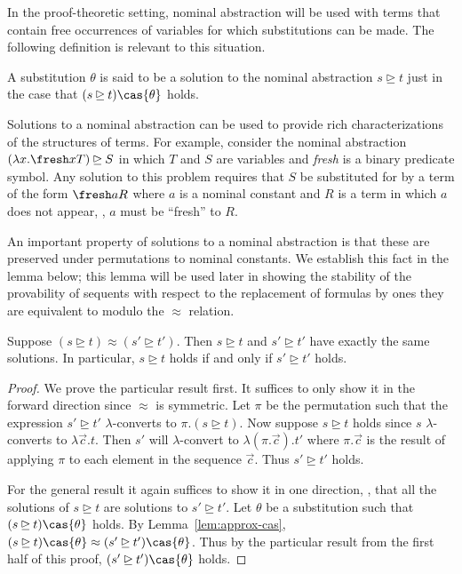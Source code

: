 In the proof-theoretic setting, nominal abstraction will be used with
terms that contain free occurrences of variables for which
substitutions can be made. The following definition is relevant to
this situation.

\begin{definition}\label{nasolution}
A substitution $\theta$ is said to be a solution to the nominal
abstraction $s \unrhd t$ just in the case that $(s\unrhd t)\cas{\theta}$ holds.
\end{definition}

Solutions to a nominal abstraction can be used to provide rich
characterizations of the structures of terms. For example, consider
the nominal abstraction
$(\lambda x.\fresh x T) \unrhd S$ in which $T$ and $S$ are
variables and {\sl fresh} is a binary predicate symbol.  Any solution
to this problem requires that $S$ be
substituted for by a term of the form $\fresh a R$ where $a$
is a nominal constant and $R$ is a term in which $a$ does not appear,
\ie, $a$ must be ``fresh'' to $R$.

An important property of solutions to a nominal abstraction is that
these are preserved under permutations to nominal constants. We
establish this fact in the lemma below; this lemma will be used later
in showing the stability of the provability of sequents with
respect to the replacement of formulas by ones they are equivalent to
modulo the $\approx$ relation.

\begin{lemma}
\label{lem:na-approx}
Suppose $(s\unrhd t) \approx (s'\unrhd t')$. Then $s\unrhd t$ and
$s'\unrhd t'$ have exactly the same solutions. In particular,
$s\unrhd t$ holds if and only if $s'\unrhd t'$ holds.
\end{lemma}
\begin{proof}
We prove the particular result first. It suffices to only show it in
the forward direction since $\approx$ is symmetric. Let $\pi$ be the
permutation such that the expression $s'\unrhd t'$ $\lambda$-converts to
$\pi.(s\unrhd t)$. Now suppose $s \unrhd t$ holds since $s$
$\lambda$-converts to $\lambda\vec{c}.t$. Then $s'$ will
$\lambda$-convert to $\lambda(\pi.\vec{c}).t'$ where $\pi.\vec{c}$ is
the result of applying $\pi$ to each element in the sequence $\vec{c}$.
Thus $s' \unrhd t'$ holds.

For the general result it again suffices to show it in one direction,
\ie, that all the solutions of $s\unrhd t$ are solutions to $s'\unrhd
t'$. Let $\theta$ be a substitution such that $(s\unrhd
t)\cas{\theta}$ holds. By Lemma~\ref{lem:approx-cas}, $(s\unrhd
t)\cas{\theta} \approx (s'\unrhd t')\cas{\theta}$. Thus by the
particular result from the first half of this proof, $(s'\unrhd
t')\cas{\theta}$ holds.
\end{proof}

